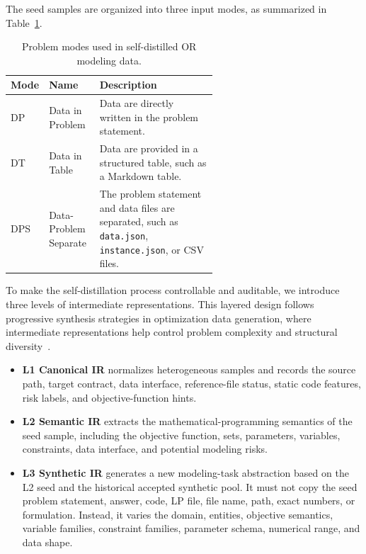 
The seed samples are organized into three input modes, as summarized in Table~\ref{tab:sft_problem_modes}.

\begin{table}[t]
\centering
\small
\caption{Problem modes used in self-distilled OR modeling data.}
\label{tab:sft_problem_modes}
\begin{tabular}{llp{0.58\linewidth}}
\toprule
Mode & Name & Description \\
\midrule
DP & Data in Problem & Data are directly written in the problem statement. \\
DT & Data in Table & Data are provided in a structured table, such as a Markdown table. \\
\multirow{2}{*}{DPS} & \multirow{2}{*}{Data-Problem Separate} & The problem statement and data files are separated, such as \texttt{data.json}, \texttt{instance.json}, or CSV files. \\
\bottomrule
\end{tabular}
\end{table}

To make the self-distillation process controllable and auditable, we introduce three levels of intermediate representations. This layered design follows progressive synthesis strategies in optimization data generation, where intermediate representations help control problem complexity and structural diversity~\citep{yang2025optibench,wu2025training}.
\begin{itemize}
    \item \textbf{L1 Canonical IR} normalizes heterogeneous samples and records the source path, target contract, data interface, reference-file status, static code features, risk labels, and objective-function hints.
    \item \textbf{L2 Semantic IR} extracts the mathematical-programming semantics of the seed sample, including the objective function, sets, parameters, variables, constraints, data interface, and potential modeling risks.
    \item \textbf{L3 Synthetic IR} generates a new modeling-task abstraction based on the L2 seed and the historical accepted synthetic pool. It must not copy the seed problem statement, answer, code, LP file, file name, path, exact numbers, or formulation. Instead, it varies the domain, entities, objective semantics, variable families, constraint families, parameter schema, numerical range, and data shape.
\end{itemize}

